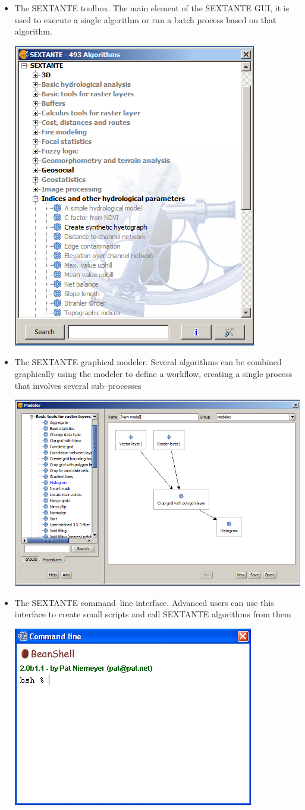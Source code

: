 \begin{itemize}
	\item The SEXTANTE toolbox. The main element of the SEXTANTE GUI, it is used to execute a single algorithm or run a batch process based on that algorithm.
		\begin{center}
		\includegraphics[width=.5\columnwidth]{toolbox.png}
		\end{center}
	\item The SEXTANTE graphical modeler. Several algorithms can be combined graphically using the modeler to define a workflow, creating a single process that involves several sub--processes
		\begin{center}
		\includegraphics[width=.8\columnwidth]{models.png}
		\end{center}			
	\item The SEXTANTE command--line interface. Advanced users can use this interface to create small scripts and call SEXTANTE algorithms from them
		\begin{center}
		\includegraphics[width=.6\columnwidth]{command_line.png}

\end{center}
\end{itemize}
